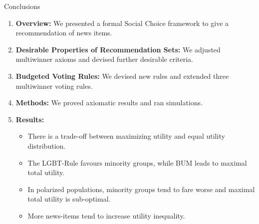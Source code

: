 \documentclass{beamer}
\begin{document}
\begin{frame}{Conclusions}
\begin{enumerate}
	\item \textbf{Overview:} We presented a formal Social Choice framework to give a recommendation of news items.
	\item \textbf{Desirable Properties of Recommendation Sets:} We adjusted multiwinner axioms and devised further desirable criteria.
	\item \textbf{Budgeted Voting Rules:} We devised new rules and extended three multiwinner voting rules.
	\item \textbf{Methods:} We proved axiomatic results and ran simulations.
	\item \textbf{Results:}
\begin{itemize}
\item There is a trade-off between maximizing utility and equal utility distribution.
\item The LGBT-Rule favours minority groups, while BUM leads to maximal total utility.
\item In polarized populations, minority groups tend to fare worse and maximal total utility is sub-optimal.
\item More news-items tend to increase utility inequality.
\end{itemize}
\end{enumerate}
\end{frame}

%
%


%
\end{document}

